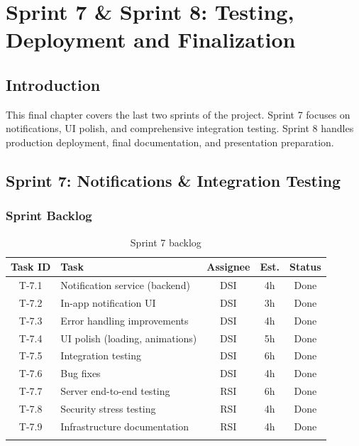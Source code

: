 \chapter{Sprint 7 \& Sprint 8: Testing, Deployment and Finalization}

\section{Introduction}

This final chapter covers the last two sprints of the project. Sprint 7 focuses on notifications, UI polish, and comprehensive integration testing. Sprint 8 handles production deployment, final documentation, and presentation preparation.

\section{Sprint 7: Notifications \& Integration Testing}


\subsection{Sprint Backlog}

\begin{longtable}{|c|p{5cm}|c|c|c|}
\hline
\rowcolor{blue!15}
\textbf{Task ID} & \textbf{Task} & \textbf{Assignee} & \textbf{Est.} & \textbf{Status} \\
\hline
\endhead
T-7.1 & Notification service (backend) & DSI & 4h & Done \\
\hline
T-7.2 & In-app notification UI & DSI & 3h & Done \\
\hline
T-7.3 & Error handling improvements & DSI & 4h & Done \\
\hline
T-7.4 & UI polish (loading, animations) & DSI & 5h & Done \\
\hline
T-7.5 & Integration testing & DSI & 6h & Done \\
\hline
T-7.6 & Bug fixes & DSI & 4h & Done \\
\hline
T-7.7 & Server end-to-end testing & RSI & 6h & Done \\
\hline
T-7.8 & Security stress testing & RSI & 4h & Done \\
\hline
T-7.9 & Infrastructure documentation & RSI & 4h & Done \\
\hline
\caption{Sprint 7 backlog}
\label{tab:sprint7-backlog}
\end{longtable}

